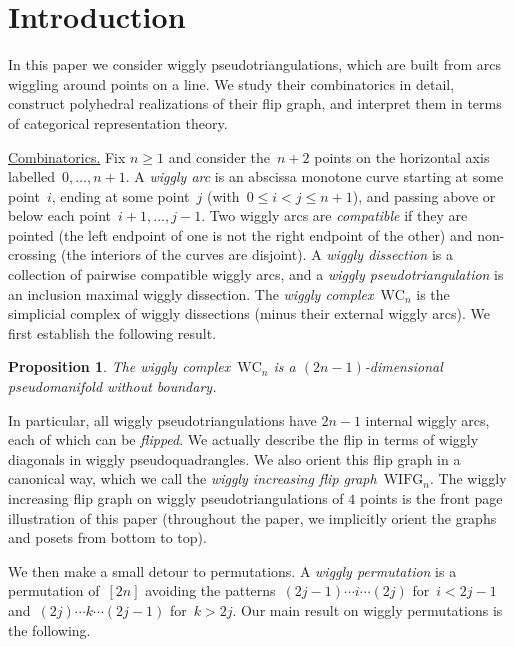 \documentclass{amsart}
\newtheorem*{proposition*}{Proposition}%
\theoremstyle{definition}
\newcommand{\darkblue}{\color{darkblue}} %
\newcommand{\defn}[1]{\textsl{\darkblue #1}} %
\newcommand{\para}[1]{\smallskip\noindent\uline{#1.}} %
\newcommand{\wigglyComplex}{\mathrm{WC}} %
\newcommand{\wigglyIncreasingFlipGraph}{\mathrm{WIFG}} %
\begin{document}
\tableofcontents


\section{Introduction}

In this paper we consider wiggly pseudotriangulations, which are built from arcs wiggling around points on a line.
We study their combinatorics in detail, construct polyhedral realizations of their flip graph, and interpret them in terms of categorical representation theory.

\bigskip
\para{Combinatorics}
Fix $n \ge 1$ and consider the~$n+2$ points on the horizontal axis labelled~${0, \dots, n+1}$.
A \defn{wiggly arc} is an abscissa monotone curve starting at some point~$i$, ending at some point~$j$ (with~${0 \le i < j \le n+1}$), and passing above or below each point~$i+1, \dots, j-1$.
Two wiggly arcs are \defn{compatible} if they are pointed (the left endpoint of one is not the right endpoint of the other) and non-crossing (the interiors of the curves are disjoint).
A \defn{wiggly dissection} is a collection of pairwise compatible wiggly arcs, and a \defn{wiggly pseudotriangulation} is an inclusion maximal wiggly dissection.
The \defn{wiggly complex}~$\wigglyComplex_n$ is the simplicial complex of wiggly dissections (minus their external wiggly arcs).
We first establish the following result.

\begin{proposition*}
The wiggly complex~$\wigglyComplex_n$ is a $(2n-1)$-dimensional pseudomanifold without boundary.
\end{proposition*}

In particular, all wiggly pseudotriangulations have $2n-1$ internal wiggly arcs, each of which can be \defn{flipped}.
We actually describe the flip in terms of wiggly diagonals in wiggly pseudoquadrangles.
We also orient this flip graph in a canonical way, which we call the \defn{wiggly increasing flip graph}~$\wigglyIncreasingFlipGraph_n$.
The wiggly increasing flip graph on wiggly pseudotriangulations of $4$ points is the front page illustration of this paper (throughout the paper, we implicitly orient the graphs and posets from bottom to top).

We then make a small detour to permutations.
A \defn{wiggly permutation} is a permutation of~$[2n]$ avoiding the patterns~$(2j-1) \cdots i \cdots (2j)$ for~$i < 2j-1$ and~$(2j) \cdots k \cdots (2j-1)$ for~$k > 2j$.
Our main result on wiggly permutations is the following.
\end{document}
